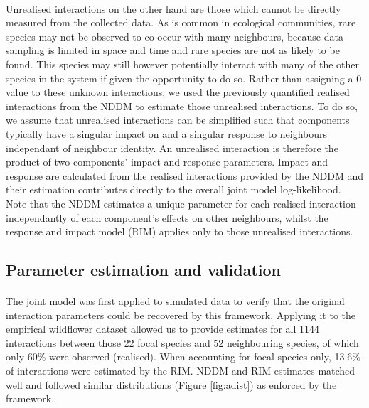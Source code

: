 \documentclass[a4,12pt]{article}
\begin{document}
    \paragraph{}
        Unrealised interactions on the other hand are those which cannot be directly measured from the collected data. As is common in ecological communities, rare species may not be observed to co-occur with many neighbours, because data sampling is limited in space and time and rare species are not as likely to be found. This species may still however potentially interact with many of the other species in the system if given the opportunity to do so. Rather than assigning a 0 value to these unknown interactions, we used the previously quantified realised interactions from the NDDM to estimate those unrealised interactions. To do so, we assume that unrealised interactions can be simplified such that components typically have a singular impact on and a singular response to neighbours independant of neighbour identity. An unrealised interaction is therefore the product of two components' impact and response parameters. Impact and response are calculated from the realised interactions provided by the NDDM and their estimation contributes directly to the overall joint model log-likelihood. Note that the NDDM estimates a unique parameter for each realised interaction independantly of each component's effects on other neighbours, whilst the response and impact model (RIM) applies only to those unrealised interactions. 

    \subsection{Parameter estimation and validation}

    \paragraph{}
        The joint model was first applied to simulated data to verify that the original interaction parameters could be recovered by this framework. Applying it to the empirical wildflower dataset allowed us to provide estimates for all 1144 interactions between those 22 focal species and 52 neighbouring species, of which only 60\% were observed (realised).  When accounting for focal species only, 13.6\% of interactions were estimated by the RIM. NDDM and RIM estimates matched well and followed similar distributions (Figure \ref{fig:adist}) as enforced by the framework. 
\end{document}
